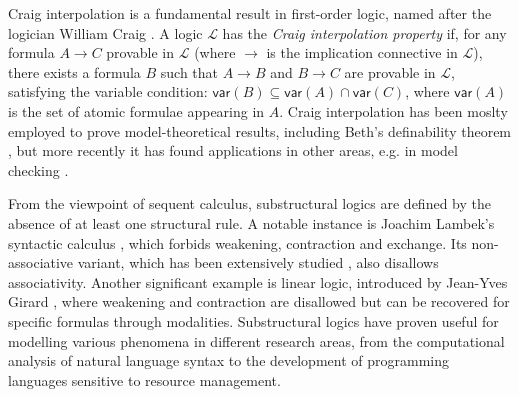 \documentclass[sn-mathphys-num]{sn-jnl}%
\newcommand{\mc}[1]{\mathcal{#1}}
\newcommand{\mf}[1]{\mathsf{#1}}
\newcommand{\vars}[1]{\mf{var} (#1)}
\theoremstyle{thmstyleone}%
\theoremstyle{thmstyletwo}%
\theoremstyle{thmstylethree}%
\begin{document}

Craig interpolation is a fundamental result in first-order logic, named after the logician William Craig \cite{craig:interpolation:1957}.
A logic $\mc{L}$ has the \emph{Craig interpolation property} if, for any formula $A \to C$ provable in $\mc{L}$ (where $\to$ is the implication connective in $\mc{L}$), there exists a formula $B$ such that $A \to B$ and $B \to C$ are provable in $\mc{L}$, satisfying the variable condition: $\vars{B} \subseteq \vars{A} \cap \vars{C}$, where $\vars{A}$ is the set of atomic formulae appearing in $A$.
Craig interpolation has been moslty employed to prove model-theoretical results, including Beth's definability theorem \cite{Beth1953}, but more recently it has found applications in other areas, e.g. in model checking \cite{Henzinger2004}.

From the viewpoint of sequent calculus, substructural logics are defined by the absence of at least one structural rule.
A notable instance is Joachim Lambek's syntactic calculus \cite{lambek:mathematics:58}, which forbids weakening, contraction and exchange.
Its non-associative variant, which has been extensively studied \cite{moot:categorial:2012}, also disallows associativity. Another significant example is linear logic, introduced by Jean-Yves Girard \cite{girard:linear:87}, where weakening and contraction are disallowed but can be recovered for specific formulas through modalities.
Substructural logics have proven useful for modelling various phenomena in different research areas, from the computational analysis of natural language syntax to the development of programming languages sensitive to resource management.
\end{document}
